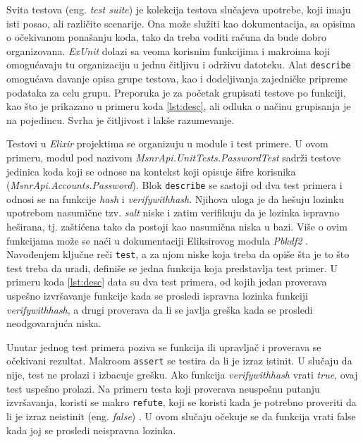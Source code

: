 \documentclass[12pt,oneside]{memoir}
\begin{document}
\par Svita testova (eng. \emph{test suite}) je kolekcija testova slučajeva upotrebe, koji imaju isti posao, ali različite scenarije. Ona može služiti kao dokumentacija, sa opisima o očekivanom ponašanju koda, tako da treba voditi računa da bude dobro organizovana. \emph{ExUnit} dolazi sa veoma korisnim funkcijima i makroima koji omogućavaju tu organizaciju u jednu čitljivu i održivu datoteku. Alat \texttt{describe} omogućava davanje opisa grupe testova, kao i dodeljivanja zajedničke pripreme podataka za celu grupu. Preporuka je za početak grupisati testove po funkciji, kao što je prikazano u primeru koda \ref{lst:desc}, ali odluka o načinu grupisanja je na pojedincu. Svrha je čitljivost i lakše razumevanje.
\par Testovi u \emph{Elixir} projektima se organizuju u module i test primere. U ovom primeru, modul pod nazivom \emph{MsnrApi.UnitTests.PasswordTest} sadrži testove jedinica koda koji se odnose na kontekst koji opisuje šifre korisnika (\emph{MsnrApi.Accounts.Password}). Blok \texttt{describe} se sastoji od dva test primera i odnosi se na funkcije \emph{hash} i \emph{verify{\textunderscore}with{\textunderscore}hash}. Njihova uloga je da hešuju lozinku upotrebom nasumične tzv. \emph{salt} niske i zatim verifikuju da je lozinka ispravno heširana, tj. zaštićena tako da postoji kao nasumična niska u bazi. Više o ovim funkcijama može se naći u dokumentaciji Eliksirovog modula \emph{Pbkdf2} \cite{pbk}. Navođenjem ključne reči \texttt{test}, a za njom niske koja treba da opiše šta je to što test treba da uradi, definiše se jedna funkcija koja predstavlja test primer. U primeru koda \ref{lst:desc} data su dva test primera, od kojih jedan proverava uspešno izvršavanje funkcije kada se prosledi ispravna lozinka funkciji \emph{verify{\textunderscore}with{\textunderscore}hash}, a drugi proverava da li se javlja greška kada se prosledi neodgovarajuća niska. 
 

\par Unutar jednog test primera poziva se funkcija ili upravljač i proverava se očekivani rezultat. Makroom \texttt{assert} se testira da li je izraz istinit. U slučaju da nije, test ne prolazi i izbacuje grešku. Ako funkcija \emph{verify{\textunderscore}with{\textunderscore}hash} vrati \emph{true}, ovaj test uspešno prolazi. Na primeru testa koji proverava neuspešnu putanju izvršavanja, koristi se makro \texttt{refute}, koji se koristi kada je potrebno proveriti da li je izraz neistinit (eng. \emph{false}) . U ovom slučaju očekuje se da funkcija vrati false kada joj se prosledi neispravna lozinka. \\
\end{document}
